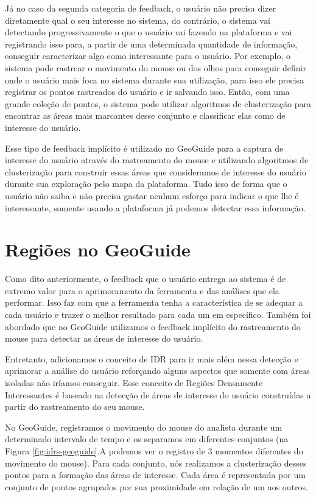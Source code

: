 Já no caso da segunda categoria de feedback, o usuário não precisa dizer diretamente qual o seu interesse no sistema, do contrário, o sistema vai detectando progressivamente o que o usuário vai fazendo na plataforma e vai registrando isso para, a partir de uma determinada quantidade de informação, conseguir caracterizar algo como interessante para o usuário. Por exemplo, o sistema pode rastrear o movimento do mouse ou dos olhos para conseguir definir onde o usuário mais foca no sistema durante sua utilização, para isso ele precisa registrar os pontos rastreados do usuário e ir salvando isso. Então, com uma grande coleção de pontos, o sistema pode utilizar algoritmos de clusterização para encontrar as áreas mais marcantes desse conjunto e classificar elas como de interesse do usuário.

Esse tipo de feedback implícito é utilizado no GeoGuide para a captura de interesse do usuário através do rastreamento do mouse e utilizando algoritmos de clusterização para construir essas áreas que consideramos de interesse do usuário durante sua exploração pelo mapa da plataforma. Tudo isso de forma que o usuário não saiba e não precisa gastar nenhum esforço para indicar o que lhe é interessante, somente usando a plataforma já podemos detectar essa informação.

\section{Regiões no GeoGuide}

Como dito anteriormente, o feedback que o usuário entrega ao sistema é de extremo valor para o aprimoramento da ferramenta e das análises que ela performar. Isso faz com que a ferramenta tenha a característica de se adequar a cada usuário e trazer o melhor resultado para cada um em específico. Também foi abordado que no GeoGuide utilizamos o feedback implícito do rastreamento do mouse para detectar as áreas de interesse do usuário.

Entretanto, adicionamos o conceito de IDR para ir mais além nessa detecção e aprimorar a análise do usuário reforçando alguns aspectos que somente com áreas isoladas não iríamos conseguir. Esse conceito de Regiões Densamente Interessantes é baseado na detecção de áreas de interesse do usuário construídas a partir do rastreamento do seu mouse.

No GeoGuide, registramos o movimento do mouse do analista durante um determinado intervalo de tempo e os separamos em diferentes conjuntos (na Figura \ref{fig:idrs-geoguide}.A podemos ver o registro de 3 momentos diferentes do movimento do mouse). Para cada conjunto, nós realizamos a clusterização desses pontos para a formação das áreas de interesse. Cada área é representada por um conjunto de pontos agrupados por sua proximidade em relação de um aos outros.

